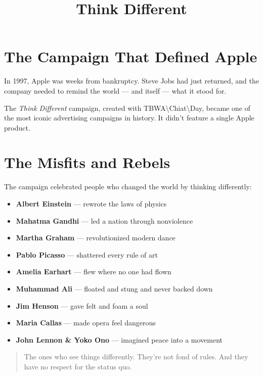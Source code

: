 \documentclass[11pt,a4paper]{article}
\title{Think Different}
\author{}
\date{}
\begin{document}
\maketitle

\section{The Campaign That Defined Apple}

In 1997, Apple was weeks from bankruptcy. Steve Jobs had just returned, and the company needed to remind the world --- and itself --- what it stood for.

The \emph{Think Different} campaign, created with TBWA\textbackslash{}Chiat\textbackslash{}Day, became one of the most iconic advertising campaigns in history. It didn't feature a single Apple product.

\section{The Misfits and Rebels}

The campaign celebrated people who changed the world by thinking differently:

\begin{itemize}
  \item \textbf{Albert Einstein} --- rewrote the laws of physics
  \item \textbf{Mahatma Gandhi} --- led a nation through nonviolence
  \item \textbf{Martha Graham} --- revolutionized modern dance
  \item \textbf{Pablo Picasso} --- shattered every rule of art
  \item \textbf{Amelia Earhart} --- flew where no one had flown
  \item \textbf{Muhammad Ali} --- floated and stung and never backed down
  \item \textbf{Jim Henson} --- gave felt and foam a soul
  \item \textbf{Maria Callas} --- made opera feel dangerous
  \item \textbf{John Lennon \& Yoko Ono} --- imagined peace into a movement
\end{itemize}

\begin{quote}
The ones who see things differently. They're not fond of rules.
And they have no respect for the status quo.
\end{quote}
\end{document}
